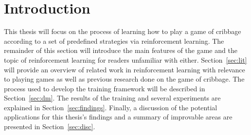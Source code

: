\section{Introduction}
\label{sec:intro}


This thesis will focus on
the process of learning how to play a game of cribbage
according to a set of predefined strategies
via reinforcement learning.
%
The remainder of this section will introduce the main features
of the game and the topic of reinforcement learning for readers unfamiliar with
either.
%
Section~\ref{sec:lit} will provide an overview of related work in reinforcement
learning with relevance to playing games
as well as previous research done on the game of cribbage.
%
The process used to develop the training framework
will be described in Section~\ref{sec:dm}.
%
The results of the training and several experiments
are explained in Section~\ref{sec:findings}.
%
Finally,
a discussion of the potential applications for this thesis's findings and
a summary of improvable areas are presented in Section~\ref{sec:disc}.






